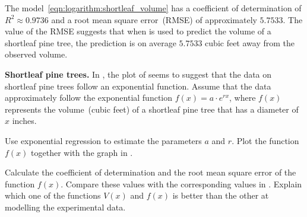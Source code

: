 \documentclass[a4paper,oneside,12pt]{article}
\begin{document}
\begin{solution}
The model~\eqref{eqn:logarithm:shortleaf_volume} has a coefficient of
determination of $R^2 \approx 0.9736$ and a root mean square
error~(RMSE) of approximately $5.7533$.  The value of the RMSE
suggests that when  is used
to predict the volume of a shortleaf pine tree, the prediction is on
average $5.7533$ cubic feet away from the observed volume.
\end{solution}

\begin{exercise}
\textbf{Shortleaf pine trees.}
In , the plot of
 seems to suggest that the data
on shortleaf pine trees follow an exponential function.  Assume that
the data approximately follow the exponential function
$f(x) = a \cdot e^{rx}$, where $f(x)$ represents the volume~(cubic
feet) of a shortleaf pine tree that has a diameter of $x$ inches.
\begin{packedenum}
\item\label{subex:logarithm:shortleaf_exponential_regression}
  Use exponential regression to estimate the parameters $a$ and $r$.
  Plot the function $f(x)$ together with the graph in
  .

\item\label{subex:logarithm:shortleaf_exponential_R^2_RMS_error}
  Calculate the coefficient of determination and the root mean square
  error of the function $f(x)$.  Compare these values with the
  corresponding values in .
  Explain which one of the functions $V(x)$ and $f(x)$ is better than
  the other at modelling the experimental data.
\end{packedenum}
\end{exercise}
\end{document}
